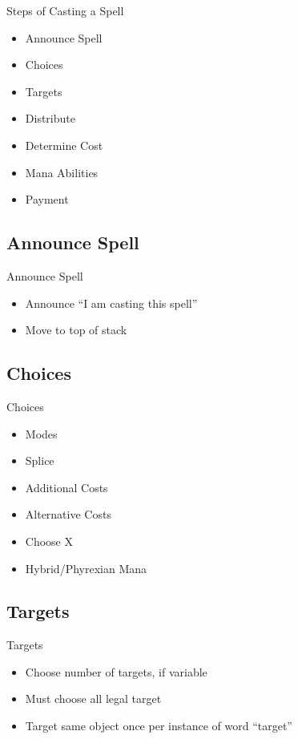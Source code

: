 \documentclass[utf8x]{beamer}
\begin{document}
    \begin{frame}{Steps of Casting a Spell}
      \begin{itemize}
        \item Announce Spell
        \item Choices
        \item Targets
        \item Distribute
        \item Determine Cost
        \item Mana Abilities
        \item Payment
      \end{itemize}
    \end{frame}

  \subsection*{Announce Spell}
    \begin{frame}{Announce Spell}
      \begin{itemize}
        \item Announce ``I am casting this spell''
        \item Move to top of stack
      \end{itemize}
    \end{frame}

  \subsection*{Choices}
    \begin{frame}{Choices}
      \begin{itemize}
        \item Modes \pause
        \item Splice \pause
        \item Additional Costs \pause
        \item Alternative Costs \pause
        \item Choose X \pause
        \item Hybrid/Phyrexian Mana \pause
      \end{itemize}
    \end{frame}

  \subsection*{Targets}
    \begin{frame}{Targets}
      \begin{itemize}
        \item Choose number of targets, if variable
        \item Must choose all legal target
        \item Target same object once per instance of word ``target''
      \end{itemize}
    \end{frame}
\end{document}
